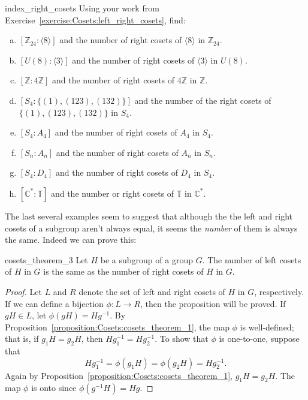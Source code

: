 \begin{exercise}{index_right_cosets}
Using your work from Exercise~\ref{exercise:Cosets:left_right_cosets}, find:

\begin{enumerate}[(a)]
\item
$[ {\mathbb Z}_{24}: \langle 8 \rangle ]$ and the number of right cosets of $\langle 8 \rangle$ in ${\mathbb Z}_{24}$.

\item
$[ U(8) : \langle 3 \rangle ]$ and the number of right cosets of $\langle 3 \rangle$ in $U(8)$.

\item
$[{\mathbb Z} : 4{\mathbb Z} ]$ and the number of right cosets of $4{\mathbb Z}$ in ${\mathbb Z}$.

\item
$[  S_4 : \{ (1), (123), (132) \}  ]$ and the number of the right cosets of $\{ (1), (123), (132) \}$ in $S_4$.

\item
$[ S_4 : A_4 ]$ and the number of right cosets of $A_4$ in $S_4$.

\item
$[ S_n : A_n ]$ and the number of right cosets of $A_n$ in $S_n$.

\item
$[S_4 : D_4  ]$ and the number of right cosets of $D_4$ in $S_4$.

\item
$[ {\mathbb C}^\ast : {\mathbb T} ]$ and the number or right cosets of ${\mathbb T}$ in ${\mathbb C}^\ast$.

\end{enumerate}
\end{exercise}

The last several examples seem to suggest that although the the left and right cosets of a subgroup aren't always equal, it seems the \emph{number} of them is always the same.  Indeed we can prove this:

\begin{prop}{cosets_theorem_3}
Let $H$ be a subgroup of a group $G$.  The number of left cosets of $H$ in $G$ is the same as the number of right cosets of $H$ in $G$.  
\end{prop}

 
\begin{proof}
Let $L$ and  $R$ denote the set of left and right cosets of $H$ in $G$, respectively.  If we can define a bijection $\phi :  L \rightarrow R$, then the proposition will be proved.  If $gH \in L$, let $\phi( gH ) = Hg^{-1}$.  By Proposition~\ref{proposition:Cosets:cosets_theorem_1}, the map $\phi$ is well-defined; that is, if $g_1 H = g_2 H$, then $H g_1^{-1} = H g_2^{-1}$.  To show that $\phi$ is one-to-one, suppose that 
\[
H g_1^{-1} = \phi( g_1 H ) = \phi( g_2 H ) = H g_2^{-1}.
\]
Again by Proposition~\ref{proposition:Cosets:cosets_theorem_1}, $g_1 H = g_2 H$.  The map $\phi$ is onto since $\phi(g^{-1} H ) = H g$. 
\hspace*{1in}
\end{proof}
 


